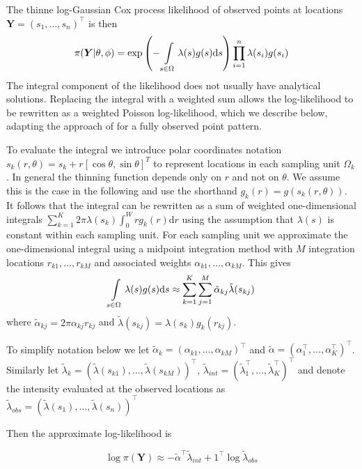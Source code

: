 \documentclass[preprint,12pt]{elsarticle}
\newcommand{\bm}{\boldsymbol}  %
\newcommand{\tl}{\tilde{\lambda}}   %
\begin{document}
The thinne log-Gaussian Cox process likelihood of observed points at locations $\bm{Y} = (s_1, \ldots, s_n)^\intercal$ is then
\begin{equation}
\label{lgcp-likelihood}
\pi(\bm{Y} | \theta, \phi) = \exp\left(-\int\displaylimits_{s \in \Omega} \lambda(s) g(s) \mathrm{d}s \right)\prod_{i=1}^n \lambda(s_i)g(s_i)
\end{equation}
The integral component of the likelihood does not usually have analytical solutions.  Replacing the integral with a weighted sum allows the log-likelihood to be rewritten as a weighted Poisson log-likelihood, which we describe below, adapting the approach of \cite{simpson_going_2016} for a fully observed point pattern.

To evaluate the integral we introduce polar coordinates notation $s_k(r, \theta) = s_k + r\left[\cos\theta, \sin\theta \right]^T$ to represent locations in each sampling unit $\Omega_k$.   In general the thinning function depends only on $r$ and not on $\theta$.  We assume this is the case in the following and use the shorthand $g_k(r) = g(s_k(r, \theta))$. It follows that the integral can be rewritten as a sum of weighted one-dimensional integrals $\sum_{k=1}^K 2\pi \lambda(s_k) \int_0^W r g_k(r)\mathrm{d}r$ using the assumption that $\lambda(s)$ is constant within each sampling unit.  For each sampling unit we approximate the one-dimensional integral using a midpoint integration method with $M$ integration locations $r_{k1}, \ldots, r_{kM}$ and associated weights $\alpha_{k1}, \ldots, \alpha_{kM}$.  This gives
\begin{equation*}
	\int\displaylimits_{s \in \Omega} \lambda(s)g(s)\mathrm{d}s \approx \sum_{k=1}^K \sum_{j=1}^M \tilde{\alpha}_{kj} \tl(s_{kj})
\end{equation*}
where $\tilde{\alpha}_{kj} = 2\pi \alpha_{kj}r_{kj}$ and $\tl(s_{kj}) = \lambda(s_k) g_k(r_{kj})$.

To simplify notation below we let $\tilde{\alpha}_{k} = (\alpha_{k1}, \ldots, \alpha_{kM})^\intercal$ and $\tilde{\alpha} = (\alpha_1^\intercal, \ldots, \alpha_K^\intercal)^\intercal$.  Similarly let $\tl_k = (\tl(s_{k1}), \ldots, \tl(s_{kM}))^\intercal$, $\tl_{int} = (\tl_1^\intercal, \ldots, \tl_K^\intercal)^\intercal$ and denote the intensity evaluated at the observed locations as $\tl_{obs} = (\tl(s_1), \ldots, \tl(s_n))^\intercal$

Then the approximate log-likelihood is

\begin{equation}
\label{approx-log-likelihood}
	\log \pi(\bm{Y}) \approx - \tilde{\alpha}^\intercal \tl_{int} + 1^\intercal\log\tl_{obs}
\end{equation}
\end{document}
